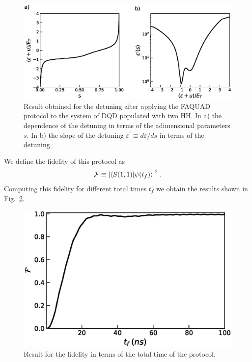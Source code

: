 \documentclass[a4paper,11pt]{article}
\begin{document}
\begin{figure}[!htbp]
	\centering
	\includegraphics[width=1\linewidth]{FAQUAD_detuning_2QD_2HH.eps}
	\caption{Result obtained for the detuning after applying the FAQUAD protocol to the system of DQD populated with two HH. In a) the dependence of the detuning in terms of the adimensional parameters $s$. In b) the slope of the detuning $\varepsilon^\prime\equiv d \varepsilon/d s$ in terms of the detuning.}
	\label{fig:FAQUAD_detuning_2QD_2HH}
\end{figure}

We define the fidelity of this protocol as
\begin{equation}
	\mathcal{F}\equiv \abs{\braket{S(1,1)}{\psi(t_f)}}^2\; .
\end{equation}
Computing this fidelity for different total times $t_f$ we obtain the results shown in Fig.~\ref{fig:FAQUAD_2QD_Results}.
\begin{figure}[!htbp]
	\centering
	\includegraphics[width=0.7\linewidth]{FAQUAD_2QD_Results.eps}
	\caption{Result for the fidelity in terms of the total time of the protocol.}
	\label{fig:FAQUAD_2QD_Results}
\end{figure}
\end{document}
